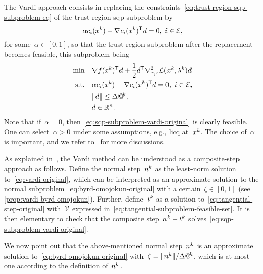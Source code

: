 The Vardi approach consists in replacing the constraints~\cref{eq:trust-region-sqp-subproblem-eq} of the trust-region \gls{sqp} subproblem by
\begin{equation}
    \label{eq:vardi-original}
    \alpha \con{i}(\iter[k]) + \nabla \con{i}(\iter[k])^{\T} \step = 0, ~ i \in \ieq,
\end{equation}
for some~$\alpha \in [0, 1]$, so that the trust-region subproblem after the replacement becomes feasible, this subproblem being
\begin{subequations}
    \label{eq:sqp-subproblem-vardi-original}
    \begin{align}
        \min        & \quad \nabla \obj(\iter[k])^{\T} \step + \frac{1}{2} \step^{\T} \nabla_{x, x}^2 \lag(\iter[k], \lm[k]) \step\\
        \text{s.t.} & \quad \alpha \con{i}(\iter[k]) + \nabla \con{i}(\iter[k])^{\T} \step = 0, ~ i \in \ieq,\\
                    & \quad \norm{\step} \le \rad[k],\\
                    & \quad \step \in \R^n. \nonumber
    \end{align}
\end{subequations}
Note that if~$\alpha = 0$, then~\cref{eq:sqp-subproblem-vardi-original} is clearly feasible.
One can select~$\alpha > 0$ under some assumptions, e.g., \gls{licq} at~$\iter[k]$.
The choice of~$\alpha$ is important, and we refer to~\cite[\S~15.4.1]{Conn_Gould_Toint_2000} for more discussions.

As explained in~\cite[\S~15.4.1]{Conn_Gould_Toint_2000}, the Vardi method can be understood as a composite-step approach as follows.
Define the normal step~$\nstep[k]$ as the least-norm solution to~\cref{eq:vardi-original}, which can be interpreted as an approximate solution to the normal subproblem~\cref{eq:byrd-omojokun-original} with a certain~$\zeta \in [0, 1]$ (see \cref{prop:vardi-byrd-omojokun}).
Further, define~$\tstep[k]$ as a solution to~\cref{eq:tangential-step-original} with~$\mathcal{V}$ expressed in~\cref{eq:tangential-subproblem-feasible-set}.
It is then elementary to check that the composite step~$\nstep[k] + \tstep[k]$ solves~\cref{eq:sqp-subproblem-vardi-original}.

We now point out that the above-mentioned normal step~$\nstep[k]$ is an approximate solution to~\cref{eq:byrd-omojokun-original} with~$\zeta = \norm{\nstep[k]} / \rad[k]$, which is at most one according to the definition of~$\nstep[k]$.

